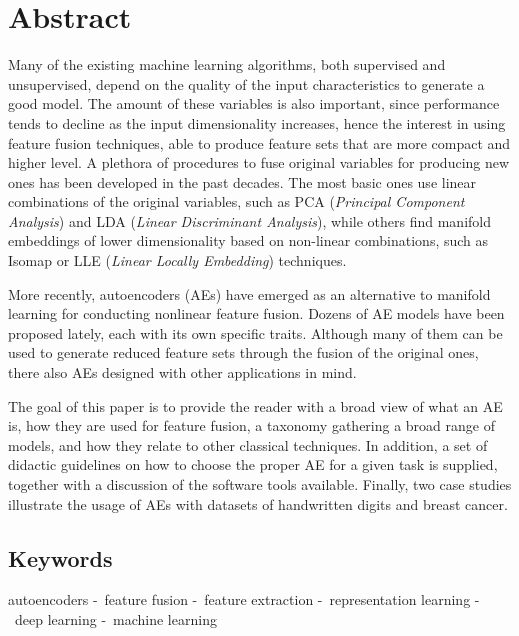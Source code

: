 \setchapterpreamble[u]{\margintoc}
\providecommand{\sep}{-~}

\label{ch:paper1}


\section*{Abstract}
Many of the existing machine learning algorithms, both supervised and unsupervised, depend on the quality of the input characteristics to generate a good model. The amount of these variables is also important, since performance tends to decline as the input dimensionality increases, hence the interest in using feature fusion techniques, able to produce feature sets that are more compact and higher level. A plethora of procedures to fuse original variables for producing new ones has been developed in the past decades. The most basic ones use linear combinations of the original variables, such as PCA (\textit{Principal Component Analysis}) and LDA (\textit{Linear Discriminant Analysis}), while others find manifold embeddings of lower dimensionality based on non-linear combinations, such as Isomap or LLE (\textit{Linear Locally Embedding}) techniques. 

More recently, autoencoders (AEs) have emerged as an alternative to manifold learning for conducting nonlinear feature fusion. Dozens of AE models have been proposed lately, each with its own specific traits. Although many of them can be used to generate reduced feature sets through the fusion of the original ones, there also AEs designed with other applications in mind.

The goal of this paper is to provide the reader with a broad view of what an AE is, how they are used for feature fusion, a taxonomy gathering a broad range of models, and how they relate to other classical techniques. In addition, a set of didactic guidelines on how to choose the proper AE for a given task is supplied, together with a discussion of the software tools available. Finally, two case studies illustrate the usage of AEs with datasets of handwritten digits and breast cancer.

\subsection*{Keywords}
autoencoders \sep feature fusion \sep feature extraction \sep representation learning \sep deep learning \sep machine learning

